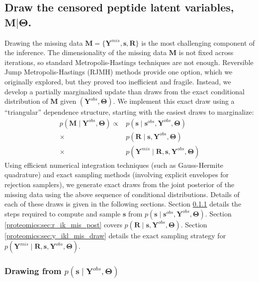 \subsection{Draw the censored peptide latent variables, $\mathbf{M} \vert \bm \Theta$.}
\label{proteomics:sec:missingDataDraw}

Drawing the missing data $\mathbf{M}=\{\mathbf{Y}^{mis},\mathbf{s},\mathbf{R}\}$ is the most challenging component of the inference.
The dimensionality of the missing data $\mathbf{M}$ is not fixed across iterations, so standard Metropolis-Hastings techniques are not enough.
Reversible Jump Metropolis-Hastings (RJMH) methods provide one option, which we originally explored, but they proved too inefficient and fragile.
Instead, we develop a partially marginalized update than draws from the exact conditional distribution of $\bm M$ given $(\bm Y^{obs}, \bm \Theta)$.
We implement this exact draw using a ``triangular'' dependence structure, starting with the easiest draws to marginalize:
%
\begin{align}
p( \bm M \mid \bm{Y}^{obs}, \bm{\Theta}) \propto & p(\bm s \mid \bm{s}^{obs}, \bm {Y}^{obs}, \bm{\Theta}) \\
\nonumber
 \times & p(\bm{R} \mid \bm s, \bm{Y}^{obs}, \bm{\Theta}) \\
\nonumber
 \times & p(\bm{Y}^{mis} \mid \bm{R}, \bm{s}, \bm{Y}^{obs}, \bm{\Theta})
\end{align}
%
Using efficient numerical integration techniques (such as Gauss-Hermite quadrature) and exact sampling methods (involving explicit envelopes for rejection samplers), we generate exact draws from the joint posterior of the missing data using the above sequence of conditional distributions.
Details of each of these draws is given in the following sections.
Section \ref{proteomics:sc:draw_s_ik_mis} details the steps required to compute and sample $\bm s$ from $p(\bm s \mid \bm{s}^{obs}, \bm {Y}^{obs}, \bm{\Theta})$.
Section \ref{proteomics:sec:r_ik_mis_post} covers $p(\bm{R} \mid \bm s, \bm{Y}^{obs}, \bm{\Theta})$.
Section \ref{proteomics:sec:y_ikl_mis_draw} details the exact sampling strategy for $p(\bm{Y}^{mis} \mid \bm{R}, \bm{s}, \bm{Y}^{obs}, \bm{\Theta})$.

\subsubsection{Drawing from $p(\bm s \mid \bm {Y}^{obs}, \bm{\Theta})$} \label{proteomics:sc:draw_s_ik_mis} 

